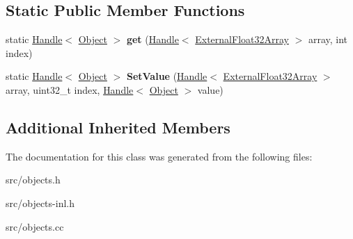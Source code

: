 \subsection*{Static Public Member Functions}
\begin{DoxyCompactItemize}
\item 
\hypertarget{classv8_1_1internal_1_1_external_float32_array_a43f850e51d9363c74600111aa61cd9d5}{}static \hyperlink{classv8_1_1internal_1_1_handle}{Handle}$<$ \hyperlink{classv8_1_1internal_1_1_object}{Object} $>$ {\bfseries get} (\hyperlink{classv8_1_1internal_1_1_handle}{Handle}$<$ \hyperlink{classv8_1_1internal_1_1_external_float32_array}{External\+Float32\+Array} $>$ array, int index)\label{classv8_1_1internal_1_1_external_float32_array_a43f850e51d9363c74600111aa61cd9d5}

\item 
\hypertarget{classv8_1_1internal_1_1_external_float32_array_afe0e63ae949d45d9073085813b55f558}{}static \hyperlink{classv8_1_1internal_1_1_handle}{Handle}$<$ \hyperlink{classv8_1_1internal_1_1_object}{Object} $>$ {\bfseries Set\+Value} (\hyperlink{classv8_1_1internal_1_1_handle}{Handle}$<$ \hyperlink{classv8_1_1internal_1_1_external_float32_array}{External\+Float32\+Array} $>$ array, uint32\+\_\+t index, \hyperlink{classv8_1_1internal_1_1_handle}{Handle}$<$ \hyperlink{classv8_1_1internal_1_1_object}{Object} $>$ value)\label{classv8_1_1internal_1_1_external_float32_array_afe0e63ae949d45d9073085813b55f558}

\end{DoxyCompactItemize}
\subsection*{Additional Inherited Members}


The documentation for this class was generated from the following files\+:\begin{DoxyCompactItemize}
\item 
src/objects.\+h\item 
src/objects-\/inl.\+h\item 
src/objects.\+cc\end{DoxyCompactItemize}
